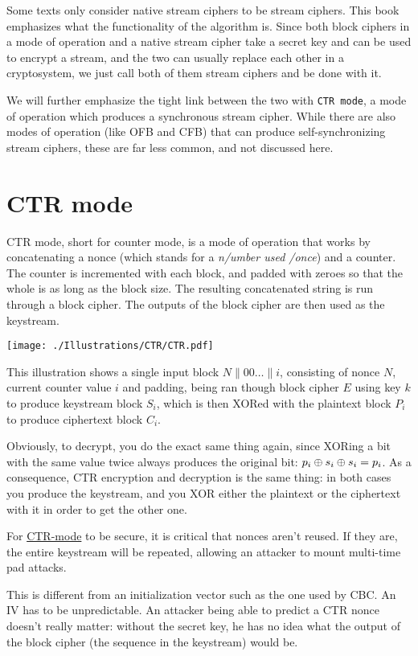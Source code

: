 \documentclass[11pt,ebook,table,dvipsnames]{memoir}
\begin{document}
Some texts only consider native \glspl{stream cipher} to be stream
ciphers. This book emphasizes what the functionality of the algorithm
is. Since both block ciphers in a \gls{mode of operation} and a native
stream cipher take a secret key and can be used to encrypt a stream,
and the two can usually replace each other in a cryptosystem, we just
call both of them stream ciphers and be done with it.

We will further emphasize the tight link between the two with \texttt{CTR
mode}, a mode of operation which produces a synchronous stream
cipher. While there are also modes of operation (like OFB and CFB)
that can produce self-synchronizing stream ciphers, these are far
less common, and not discussed here.
\section{\label{CTR-mode}CTR mode}
\label{sec-2-3-14}

\gls{CTR mode}, short for counter mode, is a \gls{mode of operation}
that works by concatenating a \gls{nonce} (which stands for a \emph{n/umber
used /once}) and a counter. The counter is incremented with each
block, and padded with zeroes so that the whole is as long as the
block size. The resulting concatenated string is run through a block
cipher. The outputs of the block cipher are then used as the
keystream.

\texttt{[image: ./Illustrations/CTR/CTR.pdf]}

This illustration shows a single input block $N \| 00 \ldots \| i$,
consisting of nonce $N$, current counter value $i$ and padding, being
ran though block cipher $E$ using key $k$ to produce keystream block
$S_i$, which is then XORed with the plaintext block $P_i$ to produce
ciphertext block $C_i$.

Obviously, to decrypt, you do the exact same thing again, since XORing
a bit with the same value twice always produces the original bit: $p_i
\oplus s_i \oplus s_i = p_i$. As a consequence, CTR encryption and
decryption is the same thing: in both cases you produce the keystream,
and you XOR either the plaintext or the ciphertext with it in order to
get the other one.

For \hyperref[CTR mode]{CTR-mode} to be secure, it is critical that \glspl{nonce} aren't
reused. If they are, the entire keystream will be repeated, allowing
an attacker to mount multi-time pad attacks.

This is different from an \gls{initialization vector} such as the one
used by CBC. An \gls{IV} has to be unpredictable. An attacker being
able to predict a CTR \gls{nonce} doesn't really matter: without the
secret key, he has no idea what the output of the block cipher (the
sequence in the keystream) would be.
\end{document}
